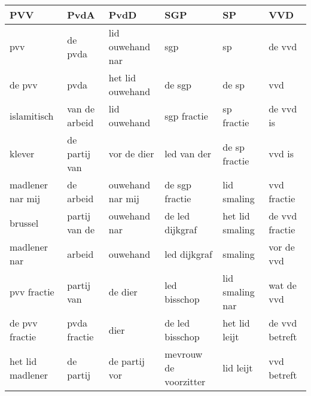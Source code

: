 \begin{tabular}{llllll}
\toprule
              PVV &           PvdA &              PvdD &                    SGP &               SP &             VVD \\
\midrule
              pvv &        de pvda &  lid ouwehand nar &                    sgp &               sp &          de vvd \\
           de pvv &           pvda &  het lid ouwehand &                 de sgp &            de sp &             vvd \\
      islamitisch &  van de arbeid &      lid ouwehand &            sgp fractie &       sp fractie &       de vvd is \\
           klever &  de partij van &       vor de dier &            led van der &    de sp fractie &          vvd is \\
 madlener nar mij &      de arbeid &  ouwehand nar mij &         de sgp fractie &      lid smaling &     vvd fractie \\
          brussel &  partij van de &      ouwehand nar &        de led dijkgraf &  het lid smaling &  de vvd fractie \\
     madlener nar &         arbeid &          ouwehand &           led dijkgraf &          smaling &      vor de vvd \\
      pvv fractie &     partij van &           de dier &           led bisschop &  lid smaling nar &      wat de vvd \\
   de pvv fractie &   pvda fractie &              dier &        de led bisschop &    het lid leijt &  de vvd betreft \\
 het lid madlener &      de partij &     de partij vor &  mevrouw de voorzitter &        lid leijt &     vvd betreft \\
\bottomrule
\end{tabular}
